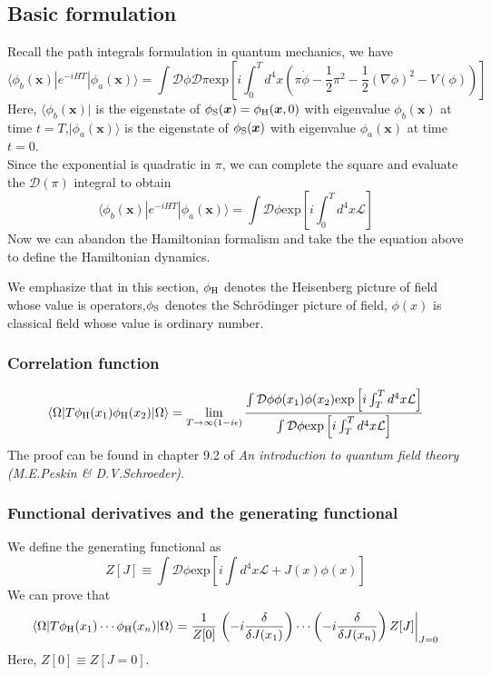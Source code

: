 \subsection{Basic formulation}
\noindent
Recall the path integrals formulation in quantum mechanics, we have
\[\langle \phi_b(\bm{x}) | e^{-iHT} | \phi_a(\bm{x}) \rangle = \int \mathcal{D}\phi \mathcal{D}\pi  \mathrm{exp} \left[ i\int_0^T d^4x (\pi\dot{\phi} - \frac{1}{2}\pi^2 - \frac{1}{2}(\nabla \phi)^2 -V(\phi))\right]\]
Here, $\langle \phi_b(\bm{x}) |$ is the eigenstate of $\phi_{\rm S}(\bm{x})=\phi_{\rm H}(\bm{x},0)$ with eigenvalue $\phi_b(\bm{x})$ at time $t=T$,$| \phi_a(\bm{x}) \rangle$ is the eigenstate of $\phi_{\rm S}(\bm{x})$ with eigenvalue $\phi_a(\bm{x})$ at time $t=0$.\\
Since the exponential is quadratic in $\pi$, we can complete the square and evaluate the $\mathcal{D}(\pi)$ integral to obtain
\[\langle \phi_b(\bm{x}) | e^{-iHT} | \phi_a(\bm{x}) \rangle = \int \mathcal{D}\phi  \mathrm{exp} \left[ i\int_0^T d^4x \mathcal{L} \right]\]
Now we can abandon the Hamiltonian formalism and take the the equation above to define the Hamiltonian dynamics.
\begin{note}
We emphasize that in this section, $\phi_{\rm H}$ denotes the Heisenberg picture of field whose value is operators,$\phi_{\rm S}$ denotes the Schr\"{o}dinger picture of field, $\phi(x)$ is classical field whose value is ordinary number.
\end{note}

\subsubsection{Correlation function}
\[\langle \Omega | T \phi_{\rm H}(x_1) \phi_{\rm H}(x_2)| \Omega \rangle = \lim_{T \to \infty(1-i\epsilon)} \frac{\int \mathcal{D}\phi \phi(x_1)\phi(x_2) \mathrm{exp} \left[ i\int_T^T d^4x \mathcal{L} \right]}{\int \mathcal{D} \phi \mathrm{exp} \left[ i\int_T^T d^4x \mathcal{L} \right]}\]
The proof can be found in chapter 9.2 of \emph{An introduction to quantum field theory (M.E.Peskin \& D.V.Schroeder)}.

\subsubsection{Functional derivatives and the generating functional}
\noindent
We define the generating functional as
\[Z[J] \equiv \int \mathcal{D} \phi \mathrm{exp} \left[ i\int d^4x \mathcal{L} + J(x)\phi(x) \right]\]
We can prove that
\[\langle \Omega | T \phi_{\rm H}(x_1) \cdots \phi_{\rm H}(x_n) | \Omega \rangle = \frac{1}{Z[0]} \left. \left( -i\frac{\delta}{\delta J(x_1)} \right)\cdots \left( -i\frac{\delta}{\delta J(x_n)} \right) Z[J]\right|_{J=0}\]
Here, $Z[0] \equiv Z[J=0]$.

